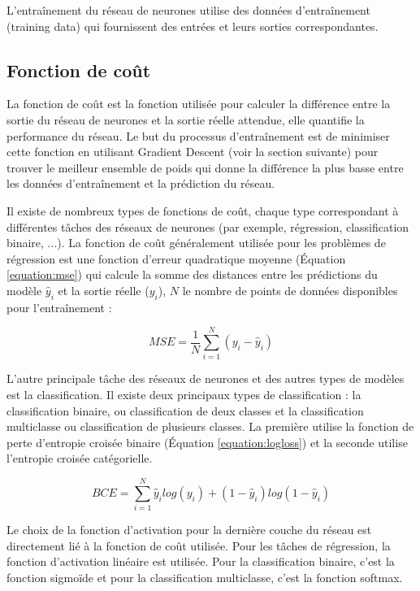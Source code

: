 L'entraînement du réseau de neurones utilise des données d'entraînement (training data) qui fournissent des entrées et leurs sorties correspondantes.

\subsection{Fonction de coût}
La fonction de coût est la fonction utilisée pour calculer la différence entre la sortie du réseau de neurones et la sortie réelle attendue, elle quantifie la performance du réseau. Le but du processus d'entraînement est de minimiser cette fonction en utilisant Gradient Descent (voir la section suivante) pour trouver le meilleur ensemble de poids qui donne la différence la plus basse entre les données d'entraînement et la prédiction du réseau.

Il existe de nombreux types de fonctions de coût, chaque type correspondant à différentes tâches des réseaux de neurones (par exemple, régression, classification binaire, ...). La fonction de coût généralement utilisée pour les problèmes de régression est une fonction d'erreur quadratique moyenne (Équation \ref{equation:mse}) qui calcule la somme des distances entre les prédictions du modèle $\hat{y}_i$ et la sortie réelle ($y_i$), $N$ le nombre de points de données disponibles pour l'entraînement :

\begin{equation}
    MSE=\frac{1}{N}\sum_{i=1}^N(y_i-\hat{y}_i)
    \label{equation:mse}
\end{equation}

L'autre principale tâche des réseaux de neurones et des autres types de modèles est la classification. Il existe deux principaux types de classification : la classification binaire, ou classification de deux classes et la classification multiclasse ou classification de plusieurs classes. La première utilise la fonction de perte d'entropie croisée binaire (Équation \ref{equation:logloss}) et la seconde utilise l'entropie croisée catégorielle.

\begin{equation}
    BCE = \sum_{i=1}^{N}\hat{y}_i log(y_i)+(1-\hat{y}_i)log(1-\hat{y}_i)
    \label{equation:logloss}
\end{equation}

Le choix de la fonction d'activation pour la dernière couche du réseau est directement lié à la fonction de coût utilisée. Pour les tâches de régression, la fonction d'activation linéaire est utilisée. Pour la classification binaire, c'est la fonction sigmoïde et pour la classification multiclasse, c'est la fonction softmax.

